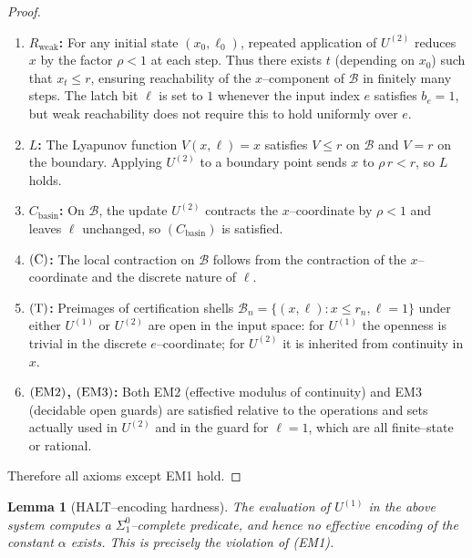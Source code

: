 \documentclass[12pt]{article}
\theoremstyle{definition}
\theoremstyle{plain}
\newtheorem{lemma}{Lemma}[section]
\begin{document}
\begin{proof}
\begin{enumerate}
\item \textbf{$R_{\mathrm{weak}}$:} For any initial state $(x_0,\ell_0)$, repeated application of $U^{(2)}$ reduces $x$ by the factor $\rho<1$ at each step. Thus there exists $t$ (depending on $x_0$) such that $x_t \le r$, ensuring reachability of the $x$–component of $\mathcal B$ in finitely many steps. The latch bit $\ell$ is set to $1$ whenever the input index $e$ satisfies $b_e=1$, but weak reachability does not require this to hold uniformly over $e$.

\item \textbf{$L$:} The Lyapunov function $V(x,\ell) = x$ satisfies $V\le r$ on $\mathcal B$ and $V=r$ on the boundary. Applying $U^{(2)}$ to a boundary point sends $x$ to $\rho\,r < r$, so $L$ holds.

\item \textbf{$C_{\mathrm{basin}}$:} On $\mathcal B$, the update $U^{(2)}$ contracts the $x$–coordinate by $\rho<1$ and leaves $\ell$ unchanged, so $(C_{\mathrm{basin}})$ is satisfied.

\item \textbf{$\textup{(C)}$:} The local contraction on $\mathcal B$ follows from the contraction of the $x$–coordinate and the discrete nature of $\ell$.

\item \textbf{$\textup{(T)}$:} Preimages of certification shells $\mathcal B_n = \{(x,\ell): x\le r_n, \ell=1\}$ under either $U^{(1)}$ or $U^{(2)}$ are open in the input space: for $U^{(1)}$ the openness is trivial in the discrete $e$–coordinate; for $U^{(2)}$ it is inherited from continuity in $x$.

\item \textbf{$\textup{(EM2)}$, $\textup{(EM3)}$:} Both EM2 (effective modulus of continuity) and EM3 (decidable open guards) are satisfied relative to the operations and sets actually used in $U^{(2)}$ and in the guard for $\ell=1$, which are all finite–state or rational.
\end{enumerate}
Therefore all axioms except EM1 hold.
\end{proof}

\begin{lemma}[HALT–encoding hardness]
\label{lem:EM1-violation-hardness}
The evaluation of $U^{(1)}$ in the above system computes a $\Sigma^0_1$–complete predicate, and hence no effective encoding of the constant $\alpha$ exists. This is precisely the violation of \textup{(EM1)}.
\end{lemma}
\end{document}
